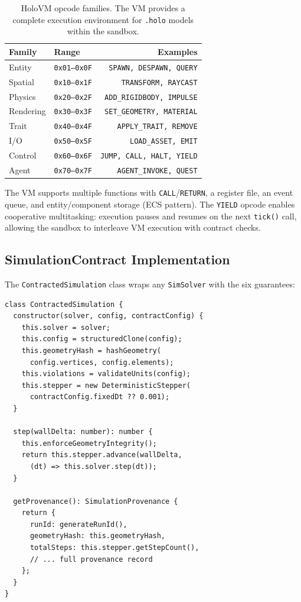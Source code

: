 \documentclass[letterpaper,twocolumn,10pt]{article}
\begin{document}
\begin{table}[t]
\centering
\caption{HoloVM opcode families. The VM provides a complete execution
  environment for \texttt{.holo} models within the sandbox.}
\label{tab:opcodes}
\small
\begin{tabular}{@{}llr@{}}
\toprule
\textbf{Family} & \textbf{Range} & \textbf{Examples} \\
\midrule
Entity    & \texttt{0x01--0x0F} & \texttt{SPAWN, DESPAWN, QUERY} \\
Spatial   & \texttt{0x10--0x1F} & \texttt{TRANSFORM, RAYCAST} \\
Physics   & \texttt{0x20--0x2F} & \texttt{ADD\_RIGIDBODY, IMPULSE} \\
Rendering & \texttt{0x30--0x3F} & \texttt{SET\_GEOMETRY, MATERIAL} \\
Trait     & \texttt{0x40--0x4F} & \texttt{APPLY\_TRAIT, REMOVE} \\
I/O       & \texttt{0x50--0x5F} & \texttt{LOAD\_ASSET, EMIT} \\
Control   & \texttt{0x60--0x6F} & \texttt{JUMP, CALL, HALT, YIELD} \\
Agent     & \texttt{0x70--0x7F} & \texttt{AGENT\_INVOKE, QUEST} \\
\bottomrule
\end{tabular}
\end{table}

The VM supports multiple functions with \texttt{CALL}/\texttt{RETURN},
a register file, an event queue, and entity/component storage (ECS
pattern). The \texttt{YIELD} opcode enables cooperative multitasking:
execution pauses and resumes on the next \texttt{tick()} call, allowing
the sandbox to interleave VM execution with contract checks.

\subsection{SimulationContract Implementation}

The \texttt{ContractedSimulation} class wraps any \texttt{SimSolver}
with the six guarantees:

\begin{lstlisting}[caption={ContractedSimulation wraps a solver with
  all six guarantees. Construction freezes the configuration and
  computes the geometry hash.}, label={lst:contracted}]
class ContractedSimulation {
  constructor(solver, config, contractConfig) {
    this.solver = solver;
    this.config = structuredClone(config);
    this.geometryHash = hashGeometry(
      config.vertices, config.elements);
    this.violations = validateUnits(config);
    this.stepper = new DeterministicStepper(
      contractConfig.fixedDt ?? 0.001);
  }

  step(wallDelta: number): number {
    this.enforceGeometryIntegrity();
    return this.stepper.advance(wallDelta,
      (dt) => this.solver.step(dt));
  }

  getProvenance(): SimulationProvenance {
    return {
      runId: generateRunId(),
      geometryHash: this.geometryHash,
      totalSteps: this.stepper.getStepCount(),
      // ... full provenance record
    };
  }
}
\end{lstlisting}
\end{document}
